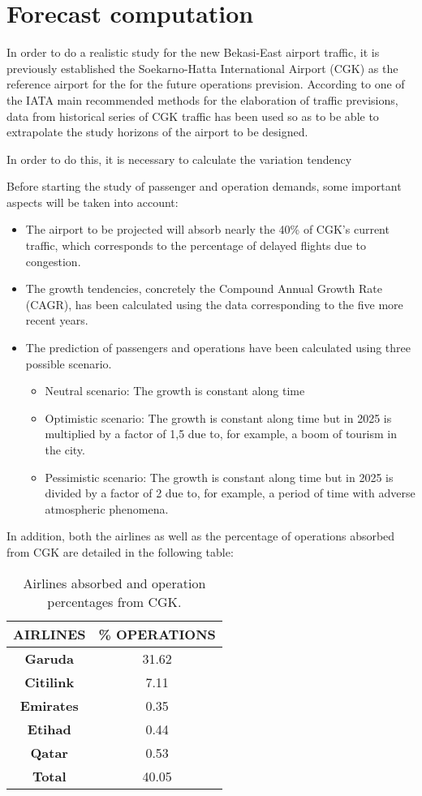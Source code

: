 \section{Forecast computation}
In order to do a realistic study for the new Bekasi-East airport traffic, it is previously established the Soekarno-Hatta International Airport (CGK) as the reference airport for the for the future operations prevision. According to one of the IATA main recommended methods for the elaboration of traffic previsions, data from historical series of CGK traffic has been used so as to be able to extrapolate the study horizons of the airport to be designed.

In order to do this, it is necessary to calculate the variation tendency 

Before starting the study of passenger and operation demands, some important aspects will be taken into account:

\begin{itemize}
	\item The airport to be projected will absorb nearly the 40\% of CGK’s current traffic, which corresponds to the percentage of delayed flights due to congestion.
	\item The growth tendencies, concretely the Compound Annual Growth Rate (CAGR), has been calculated using the data corresponding to the five more recent years.
	\item The prediction of passengers and operations have been calculated using three possible scenario.
	\begin{itemize}
		\item Neutral scenario: The growth is constant along time
		\item Optimistic scenario: The growth is constant along time but in 2025 is multiplied by a factor of 1,5 due to, for example, a boom of tourism in the city.
		\item Pessimistic scenario: The growth is constant along time but in 2025 is divided by a factor of 2 due to, for example, a period of time with adverse atmospheric phenomena.
	\end{itemize}
\end{itemize}

In addition, both the airlines as well as the percentage of operations absorbed from CGK are detailed in the following table:

	\begin{table}[ht!]
	\label{table:AirlinesAbsorbed}
	\centering
	\begin{tabular}{|c|c|}
		\hline
		\textbf{AIRLINES} & \textbf{\% OPERATIONS}\\
		\hline
		\textbf{Garuda} & 31.62\\
		\hline
		\textbf{Citilink} & 7.11\\
		\hline
		\textbf{Emirates} & 0.35\\
		\hline
		\textbf{Etihad} & 0.44\\
		\hline
		\textbf{Qatar} & 0.53\\
		\hline
		\textbf{Total} & 40.05\\
		\hline
	\end{tabular}
	\caption{Airlines absorbed and operation percentages from CGK.}
	\end{table}


